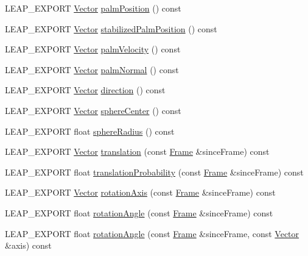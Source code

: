 \begin{DoxyCompactItemize}
\item 
L\+E\+A\+P\+\_\+\+E\+X\+P\+O\+R\+T \hyperlink{struct_leap_1_1_vector}{Vector} \hyperlink{class_leap_1_1_hand_aadb96b762b58cb79fe5f76f4c33c0682}{palm\+Position} () const 
\item 
L\+E\+A\+P\+\_\+\+E\+X\+P\+O\+R\+T \hyperlink{struct_leap_1_1_vector}{Vector} \hyperlink{class_leap_1_1_hand_ab95f0b3e24f0899fe878c755b212503d}{stabilized\+Palm\+Position} () const 
\item 
L\+E\+A\+P\+\_\+\+E\+X\+P\+O\+R\+T \hyperlink{struct_leap_1_1_vector}{Vector} \hyperlink{class_leap_1_1_hand_a990694d00a71b4847c55b8d36042c001}{palm\+Velocity} () const 
\item 
L\+E\+A\+P\+\_\+\+E\+X\+P\+O\+R\+T \hyperlink{struct_leap_1_1_vector}{Vector} \hyperlink{class_leap_1_1_hand_a6e5f1d82f6ae764ec9518088fc73c28a}{palm\+Normal} () const 
\item 
L\+E\+A\+P\+\_\+\+E\+X\+P\+O\+R\+T \hyperlink{struct_leap_1_1_vector}{Vector} \hyperlink{class_leap_1_1_hand_a144acb9740e0706c8c3542043a936b13}{direction} () const 
\item 
L\+E\+A\+P\+\_\+\+E\+X\+P\+O\+R\+T \hyperlink{struct_leap_1_1_vector}{Vector} \hyperlink{class_leap_1_1_hand_a3e614a35a61d6ff3535804ecde25094c}{sphere\+Center} () const 
\item 
L\+E\+A\+P\+\_\+\+E\+X\+P\+O\+R\+T float \hyperlink{class_leap_1_1_hand_a388e8fdcfaa06d0ebba5e207d17d05fd}{sphere\+Radius} () const 
\item 
L\+E\+A\+P\+\_\+\+E\+X\+P\+O\+R\+T \hyperlink{struct_leap_1_1_vector}{Vector} \hyperlink{class_leap_1_1_hand_a4f97a292506e9f90e9d39134008085e0}{translation} (const \hyperlink{class_leap_1_1_frame}{Frame} \&since\+Frame) const 
\item 
L\+E\+A\+P\+\_\+\+E\+X\+P\+O\+R\+T float \hyperlink{class_leap_1_1_hand_a75bee9552fbfe8f06548344736086afc}{translation\+Probability} (const \hyperlink{class_leap_1_1_frame}{Frame} \&since\+Frame) const 
\item 
L\+E\+A\+P\+\_\+\+E\+X\+P\+O\+R\+T \hyperlink{struct_leap_1_1_vector}{Vector} \hyperlink{class_leap_1_1_hand_a1b0693479f9b6d36ae03ac0bbbeeee1a}{rotation\+Axis} (const \hyperlink{class_leap_1_1_frame}{Frame} \&since\+Frame) const 
\item 
L\+E\+A\+P\+\_\+\+E\+X\+P\+O\+R\+T float \hyperlink{class_leap_1_1_hand_a49ba5ded3fcff40e2f17579cf453d34d}{rotation\+Angle} (const \hyperlink{class_leap_1_1_frame}{Frame} \&since\+Frame) const 
\item 
L\+E\+A\+P\+\_\+\+E\+X\+P\+O\+R\+T float \hyperlink{class_leap_1_1_hand_af8f2fe328d53c118fed225a9f19b896d}{rotation\+Angle} (const \hyperlink{class_leap_1_1_frame}{Frame} \&since\+Frame, const \hyperlink{struct_leap_1_1_vector}{Vector} \&axis) const 

\end{DoxyCompactItemize}
